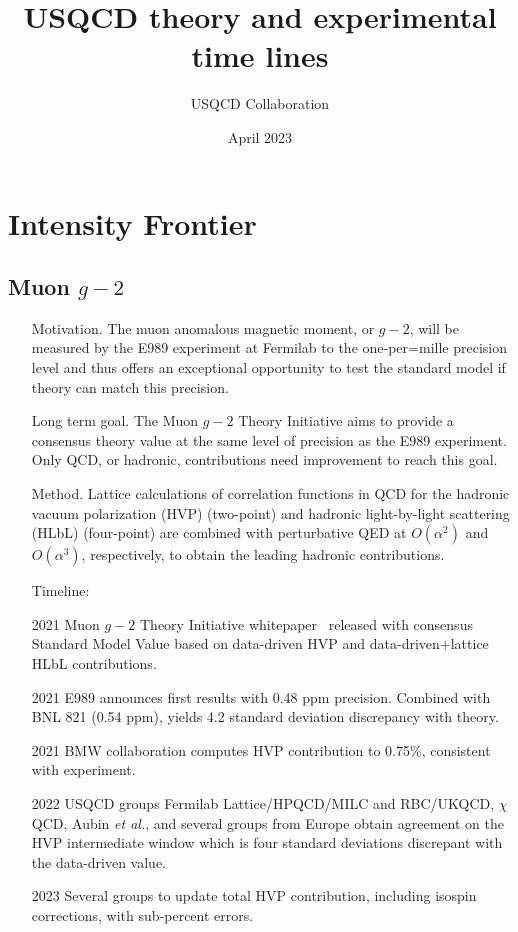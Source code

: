 \documentclass[12pt]{article}
\title{USQCD theory and experimental time lines}
\author{USQCD Collaboration}
\date{April 2023}
\begin{document}
\maketitle
\tableofcontents
\section{Intensity Frontier}\label{sec:intensity}

\subsection{Muon $g-2$}
\begin{itemize}
    \item[Motivation.] The muon anomalous magnetic moment, or $g-2$, will be measured by the E989 experiment at Fermilab to the one-per=mille precision level and thus offers an exceptional opportunity to test the standard model if theory can match this precision.
    \item[Long term goal.] The Muon $g-2$ Theory Initiative aims to provide a consensus theory value at the same level of precision as the E989 experiment. Only QCD, or hadronic, contributions need improvement to reach this goal.
\item[Method.] Lattice  calculations of correlation functions in QCD for the hadronic vacuum polarization (HVP) (two-point) and hadronic light-by-light scattering (HLbL) (four-point) are combined with perturbative QED at $O(\alpha^2)$ and $O(\alpha^3)$, respectively, to obtain the leading hadronic contributions.
\item[Timeline:]
    \item[2021] Muon $g-2$ Theory Initiative whitepaper~\cite{Aoyama:2020ynm} released with consensus Standard Model Value based on data-driven HVP and data-driven+lattice HLbL contributions.
    \item[2021] E989 announces first results with 0.48 ppm precision. Combined with BNL 821 (0.54 ppm), yields 4.2 standard deviation discrepancy with theory.
    \item[2021] BMW collaboration computes HVP contribution to 0.75\%, consistent with experiment. 
    \item[2022] USQCD groups Fermilab Lattice/HPQCD/MILC and RBC/UKQCD, $\chi$QCD, Aubin {\it et al.}, and several groups from Europe obtain agreement on the HVP intermediate window which is four standard deviations discrepant with the data-driven value.
    \item[2023] Several groups to update total HVP contribution, including isospin corrections, with sub-percent errors.

\end{itemize}
\end{document}
